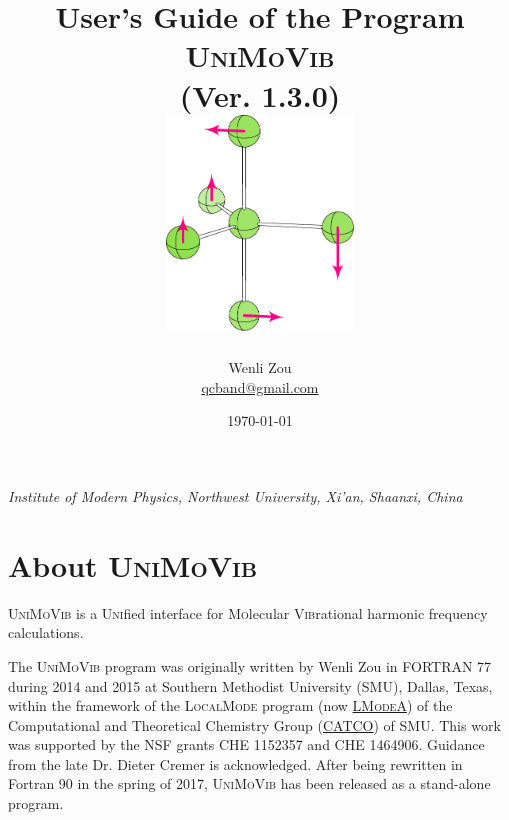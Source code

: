 \documentclass[12pt,english]{extarticle}
\begin{document}
\title{User's Guide of the Program \textsc{UniMoVib} \\
\vspace{10 mm} (Ver. 1.3.0) \vspace{30 mm} \\
\includegraphics[width=50.0mm]{fig/logo} \vspace{30 mm} }

\date{\today}

\author{Wenli Zou \\ \vspace{5mm}
\href{mailto:qcband@gmail.com}{qcband@gmail.com} \\ \vspace{10mm}}

\maketitle
\setcounter{page}{0}
\thispagestyle{empty}

\begin{center}
\emph{Institute of Modern Physics, Northwest University, Xi'an, Shaanxi, China}
\end{center}

\pagebreak{}

\tableofcontents{}

\pagebreak{}

\section{About \textsc{UniMoVib}} \label{part:about}

\textsc{UniMoVib} is a \textsc{Uni}fied interface for \textsc{Mo}lecular \textsc{Vib}rational harmonic frequency calculations.

The \textsc{UniMoVib} program was originally written by Wenli Zou in FORTRAN 77 during 2014 and 2015 at Southern Methodist University (SMU), Dallas,
Texas, within the framework of the \textsc{LocalMode} program (now \href{https://sites.smu.edu/dedman/catco/}{\textsc{LModeA}}) of the Computational and Theoretical Chemistry Group (\href{https://sites.smu.edu/dedman/catco/}{CATCO}) of SMU. This work was
supported by the NSF grants CHE 1152357 and CHE 1464906. Guidance from the late Dr. Dieter Cremer is acknowledged. After being rewritten in Fortran 90 in the spring of 2017, \textsc{UniMoVib} has been released as a stand-alone program.
\end{document}
